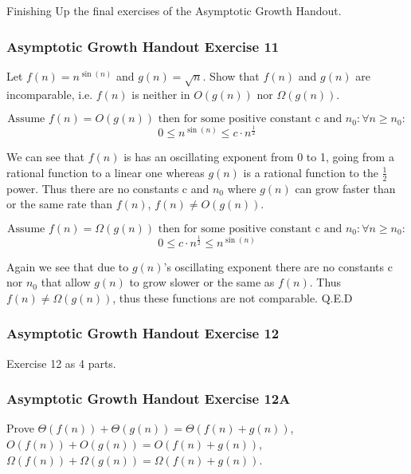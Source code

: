 \documentclass{article}
\begin{document}
Finishing Up the final exercises of the Asymptotic Growth Handout.

\subsubsection{Asymptotic Growth Handout Exercise 11}

Let $f(n) = n^{\sin(n)}$ and $g(n) = \sqrt{n}$. Show that $f(n)$ and $g(n)$ are incomparable, i.e. $f(n)$ is neither in $O(g(n))$ nor $\Omega(g(n))$. 

$$\text{Assume } f(n) = O(g(n)) \text{ then for some positive constant c and } n_0: \forall n \ge n_0: $$
$$0 \le n^{\sin(n)} \le c \cdot n^{\frac{1}{2}}$$

We can see that $f(n)$ is has an oscillating exponent from 0 to 1, going from a rational function to a linear one whereas $g(n)$ is a rational function to the $\frac{1}{2}$ power. Thus there are no constants c and $n_0$ where $g(n)$ can grow faster than or the same rate than $f(n)$, $f(n) \neq O(g(n))$. 

$$\text{Assume } f(n) = \Omega(g(n)) \text{ then for some positive constant c and } n_0: \forall n \ge n_0: $$
$$0 \le c \cdot n^{\frac{1}{2}} \le n^{\sin(n)} $$

Again we see that due to $g(n)$'s oscillating exponent there are no constants c nor $n_0$ that allow $g(n)$ to grow slower or the same as $f(n)$. Thus $f(n) \neq \Omega(g(n))$, thus these functions are not comparable. Q.E.D 

\subsubsection{Asymptotic Growth Handout Exercise 12}
Exercise 12 as 4 parts.

\subsubsection{Asymptotic Growth Handout Exercise 12A}
Prove $\Theta(f(n)) + \Theta(g(n)) = \Theta(f(n) + g(n))$, $O(f(n)) + O(g(n)) = O(f(n) + g(n))$, $\Omega(f(n)) + \Omega(g(n)) = \Omega(f(n) + g(n))$.
\end{document}
